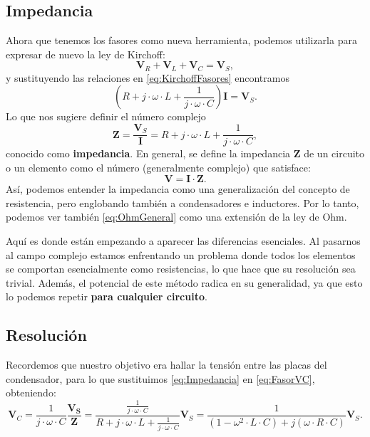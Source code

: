 \subsection{Impedancia}
Ahora que tenemos los fasores como nueva herramienta, podemos utilizarla para expresar de nuevo la ley de Kirchoff:
\begin{equation}
  \label{eq:KirchoffFasores}
  \mathbf{V}_R + \mathbf{V}_L + \mathbf{V}_C = \mathbf{V}_S,
\end{equation}
y sustituyendo las relaciones  en \eqref{eq:KirchoffFasores} encontramos
\[
  \left(R + j\cdot \omega \cdot L + \frac{1}{j\cdot \omega \cdot C}\right) \mathbf{I} = \mathbf{V}_S.
\]
Lo que nos sugiere definir el número complejo
\begin{equation}
  \label{eq:Impedancia}
  \mathbf{Z}=\frac{\mathbf{V}_S}{\mathbf{I}} = R + j\cdot \omega \cdot L + \frac{1}{j\cdot \omega \cdot C},
\end{equation}
conocido como \textbf{impedancia}. En general, se define la impedancia $\mathbf{Z}$ de un circuito o un elemento como el número (generalmente complejo) que satisface:
\begin{equation}
  \label{eq:OhmGeneral}
  \mathbf{V} = \mathbf{I}\cdot \mathbf{Z}.
\end{equation}
Así, podemos entender la impedancia como una generalización del concepto de resistencia, pero englobando también a condensadores e inductores. Por lo tanto, podemos ver también \eqref{eq:OhmGeneral} como una extensión de la ley de Ohm. 

Aquí es donde están empezando a aparecer las diferencias esenciales. Al pasarnos al campo complejo estamos enfrentando un problema donde todos los elementos se comportan esencialmente como resistencias, lo que hace que su resolución sea trivial. Además, el potencial de este método radica en su generalidad, ya que esto lo podemos repetir \textbf{para cualquier circuito}.


\subsection{Resolución}
 Recordemos que nuestro objetivo era hallar la tensión entre las placas del condensador, para lo que sustituimos \eqref{eq:Impedancia} en \eqref{eq:FasorVC}, obteniendo:
\begin{equation}
  \label{eq:SolFasor}
  \mathbf{V}_C = \frac{1}{j\cdot \omega \cdot C} \frac{\mathbf{V_S}}{\mathbf{Z}} =\frac{\frac{1}{j\cdot \omega\cdot C}}{R + j\cdot \omega \cdot L + \frac{1}{j\cdot \omega \cdot C}} \mathbf{V}_S = \frac{1}{(1-\omega^2 \cdot L\cdot C) + j(\omega\cdot R\cdot  C)} \mathbf{V}_S.
\end{equation}

